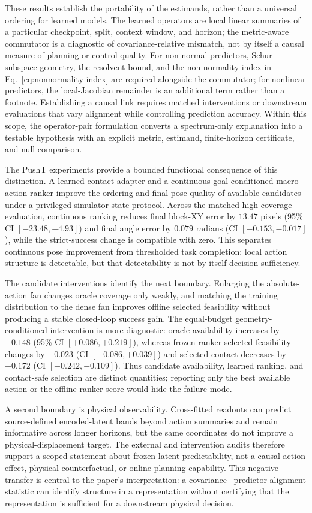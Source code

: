 \documentclass{article}
\begin{document}
These results establish the portability of the estimands, rather than a universal ordering for learned models. The learned operators are local linear summaries of a particular checkpoint, split, context window, and horizon; the metric-aware commutator is a diagnostic of covariance-relative mismatch, not by itself a causal measure of planning or control quality. For non-normal predictors, Schur-subspace geometry, the resolvent bound, and the non-normality index in Eq.~\eqref{eq:nonnormality-index} are required alongside the commutator; for nonlinear predictors, the local-Jacobian remainder is an additional term rather than a footnote. Establishing a causal link requires matched interventions or downstream evaluations that vary alignment while controlling prediction accuracy. Within this scope, the operator-pair formulation converts a spectrum-only explanation into a testable hypothesis with an explicit metric, estimand, finite-horizon certificate, and null comparison.

The PushT experiments provide a bounded functional consequence of this
distinction. A learned contact adapter and a continuous goal-conditioned
macro-action ranker improve the ordering and final pose quality of available
candidates under a privileged simulator-state protocol. Across the matched
high-coverage evaluation, continuous ranking reduces final block-XY error by
$13.47$ pixels (95\% CI $[-23.48,-4.93]$) and final angle error by
$0.079$ radians (CI $[-0.153,-0.017]$), while the strict-success change is
compatible with zero. This separates continuous pose improvement from
thresholded task completion: local action structure is detectable, but that
detectability is not by itself decision sufficiency.

The candidate interventions identify the next boundary. Enlarging the
absolute-action fan changes oracle coverage only weakly, and matching the
training distribution to the dense fan improves offline selected feasibility
without producing a stable closed-loop success gain. The equal-budget
geometry-conditioned intervention is more diagnostic: oracle availability
increases by $+0.148$ (95\% CI $[+0.086,+0.219]$), whereas frozen-ranker
selected feasibility changes by $-0.023$ (CI $[-0.086,+0.039]$) and selected
contact decreases by $-0.172$ (CI $[-0.242,-0.109]$). Thus candidate
availability, learned ranking, and contact-safe selection are distinct
quantities; reporting only the best available action or the offline ranker
score would hide the failure mode.

A second boundary is physical observability. Cross-fitted readouts can predict
source-defined encoded-latent bands beyond action summaries and remain
informative across longer horizons, but the same coordinates do not improve a
physical-displacement target. The external and intervention audits therefore
support a scoped statement about frozen latent predictability, not a causal
action effect, physical counterfactual, or online planning capability. This
negative transfer is central to the paper's interpretation: a covariance--
predictor alignment statistic can identify structure in a representation
without certifying that the representation is sufficient for a downstream
physical decision.
\end{document}
